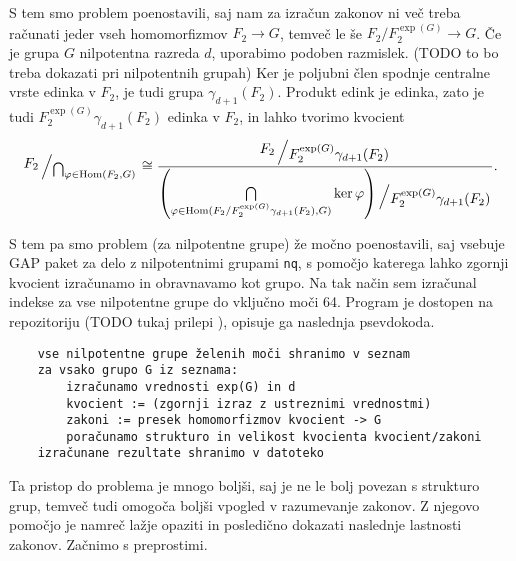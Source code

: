 S tem smo problem poenostavili, saj nam za izračun zakonov ni več treba računati jeder vseh homomorfizmov $F_2 \to G$, temveč le še $F_2 / F_2^{\exp(G)} \to G$.
Če je grupa $G$ nilpotentna razreda $d$, uporabimo podoben razmislek. 
 (TODO to bo treba dokazati pri nilpotentnih grupah) 
Ker je poljubni člen spodnje centralne vrste edinka v $F_2$, je tudi grupa $\gamma_{d+ 1}(F_2)$.
Produkt edink je edinka, zato je tudi $F_2^{\exp(G)} \gamma_{d+ 1}(F_2)$ edinka v $F_2$, in lahko tvorimo kvocient 
\begin{equation*}
    \bigslant{F_2}{\bigcap_{\varphi \in \operatorname{Hom}(F_2, G)}} \cong \dfrac{\bigslant{F_2}{F_2^{\exp(G)}\gamma_{d+1}(F_2)}}{ \bigslant{ \left( \bigcap\limits_{\varphi \in \operatorname{Hom}({F_2} / {F_2^{\exp(G)}\gamma_{d+1}(F_2)}, G)} \ker \varphi \right) }{F_2^{\exp(G)}\gamma_{d+1}(F_2)}}.
\end{equation*}

S tem pa smo problem (za nilpotentne grupe) že močno poenostavili, saj vsebuje GAP paket za delo z nilpotentnimi grupami \texttt{nq}, s pomočjo katerega lahko zgornji kvocient izračunamo in obravnavamo kot grupo.
Na tak način sem izračunal indekse za vse nilpotentne grupe do vključno moči 64. Program je dostopen na repozitoriju (TODO tukaj prilepi ), opisuje ga naslednja psevdokoda. 

\begin{verbatim}
    vse nilpotentne grupe želenih moči shranimo v seznam 
    za vsako grupo G iz seznama:
        izračunamo vrednosti exp(G) in d
        kvocient := (zgornji izraz z ustreznimi vrednostmi)
        zakoni := presek homomorfizmov kvocient -> G
        poračunamo strukturo in velikost kvocienta kvocient/zakoni
    izračunane rezultate shranimo v datoteko
\end{verbatim}

Ta pristop do problema je mnogo boljši, saj je ne le bolj povezan s strukturo grup, temveč tudi omogoča boljši vpogled v razumevanje zakonov.
Z njegovo pomočjo je namreč lažje opaziti in posledično dokazati naslednje lastnosti zakonov. Začnimo s preprostimi.

